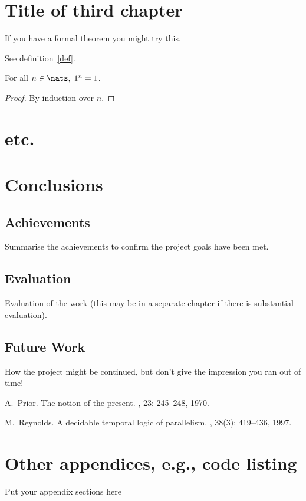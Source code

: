 \chapter{Title of third chapter}
If you have a formal theorem you might try this.
\begin{definition}\label{def}
See definition~\ref{def}.
\end{definition}
\begin{theorem}
For all $n\in\nats,\; 1^n=1$.
\end{theorem}
\begin{proof}
By induction over $n$.
\end{proof}

\chapter{etc.}


\chapter{Conclusions}
\section{Achievements}
Summarise the achievements to confirm the project goals have been met.
\section{Evaluation}
Evaluation of the work (this may be in a separate chapter if there is substantial evaluation).

\section{Future Work}
How the project might be continued, but don't give the impression you ran out of time!

\appendix


\begin{thebibliography}{HHM99}


A.~Prior.
\newblock The notion of the present.
, 23:  245--248, 1970.


M.~Reynolds.
\newblock A decidable temporal logic of parallelism.
, 38(3):  419--436,
  1997.
\end{thebibliography}
\chapter{Other appendices, e.g., code listing}
Put your appendix sections here



